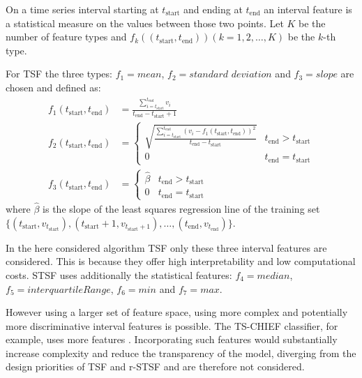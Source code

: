On a time series interval starting at $t_{\mathrm{start}}$ and ending at $t_{\mathrm{end}}$ an interval feature is a statistical 
measure on the values between those two points. 
Let $K$ be the number of feature types and $f_k((t_{\mathrm{start}}, t_{\mathrm{end}}))(k =1,2, \dots, K)$ be the $k$-th type. 
\par For TSF the three types: $f_1 = mean$, $f_2 = standard$ $deviation$ and $f_3 = slope$ are chosen and
defined as:
\begin{align*}
	f_1 (t_{\mathrm{start}}, t_{\mathrm{end}}) & = 
	\frac{\sum_{i = t_{\mathrm{start}}}^{t_{\mathrm{end}}}v_i}{t_{\mathrm{end}} - t_{\mathrm{start}} + 1} \\
	f_2 (t_{\mathrm{start}}, t_{\mathrm{end}}) & = \begin{cases}
		\sqrt{\frac{\sum^{t_{\mathrm{end}}}_{i = t_{\mathrm{start}}} ( v_i - f_1 (t_{\mathrm{start}}, t_{\mathrm{end}}))^2}{t_{\mathrm{end}} - t_{\mathrm{start}}}} & t_{\mathrm{end}} > t_{\mathrm{start}} \\
		0 & t_{\mathrm{end}} = t_{\mathrm{start}}
	\end{cases} \\
	f_3 (t_{\mathrm{start}}, t_{\mathrm{end}}) & = \begin{cases}
		\hat{\beta} & t_{\mathrm{end}} > t_{\mathrm{start}} \\
		0 & t_{\mathrm{end}} = t_{\mathrm{start}}
	\end{cases}
\end{align*}
where $\hat{\beta}$ is the slope of the least squares regression line of the training set 
$\{(t_{\mathrm{start}}, v_{t_{\mathrm{start}}}), (t_{\mathrm{start}} + 1, v_{t_{\mathrm{start}} + 1}), \dots, (t_{\mathrm{end}}, v_{t_{\mathrm{end}}})\}$.

In the here considered algorithm TSF  only these three interval features are 
considered. This is because they offer high interpretability and low computational costs. 
STSF uses additionally the statistical features: $f_4 = median$, $f_5 = interquartile Range$, $f_6= min$ and $f_7 = max$.

However using a larger
set of feature space, using more complex and potentially more discriminative interval features is possible.
The TS-CHIEF classifier, for example, uses more features . %
Incorporating such features would substantially increase complexity and reduce the transparency of the model,
diverging from the design priorities of TSF and r-STSF and are therefore not considered. %
